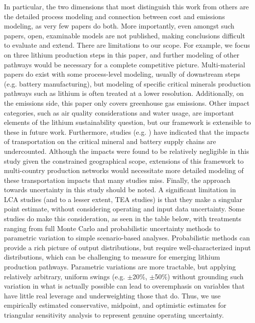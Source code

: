 In particular, the two dimensions that most distinguish this work from others are the detailed process modeling and connection between cost and emissions modeling, as very few papers do both. More importantly, even amongst such papers, open, examinable models are not published, making conclusions difficult to evaluate and extend. There are limitations to our scope. For example, we focus on three lithium production steps in this paper, and further modeling of other pathways would be necessary for a complete competitive picture.  Multi-material papers do exist with some process-level modeling, usually of downstream steps (e.g. battery manufacturing), but modeling of specific critical minerals production pathways such as lithium is often treated at a lower resolution. Additionally, on the emissions side, this paper only covers greenhouse gas emissions. Other impact categories, such as air quality considerations and water usage, are important elements of the lithium sustainability question, but our framework is extensible to these in future work. Furthermore, studies (e.g. \citet{thomsenMineManufacturerAssessing2025}) have indicated that the impacts of transportation on the critical mineral and battery supply chains are undercounted. Although the impacts were found to be relatively negligible in this study given the constrained geographical scope, extensions of this framework to multi-country production networks would necessitate more detailed modeling of these transportation impacts that many studies miss. Finally, the approach towards uncertainty in this study should be noted. A significant limitation in LCA studies (and to a lesser extent, TEA studies) is that they make a singular point estimate, without considering operating and input data uncertainty. Some studies do make this consideration, as seen in the table below, with treatments ranging from full Monte Carlo and probabilistic uncertainty methods to parametric variation to simple scenario-based analyses. Probabilistic methods can provide a rich picture of output distributions, but require well-characterized input distributions, which can be challenging to measure for emerging lithium production pathways. Parametric variations are more tractable, but applying relatively arbitrary, uniform swings (e.g. $\pm$20\%, $\pm$50\%) without grounding such variation in what is actually possible can lead to overemphasis on variables that have little real leverage and underweighting those that do. Thus, we use empirically estimated conservative, midpoint, and optimistic estimates for triangular sensitivity analysis to represent genuine operating uncertainty. 

